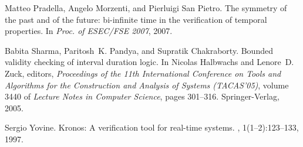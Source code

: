 \documentclass[a4paper]{article}
\theoremstyle{plain}
\theoremstyle{definition}
\begin{document}
\begin{thebibliography}{10}
Matteo Pradella, Angelo Morzenti, and Pierluigi {San Pietro}.
\newblock The symmetry of the past and of the future: bi-infinite time in the
  verification of temporal properties.
\newblock In {\em Proc. of ESEC/FSE 2007}, 2007.

Babita Sharma, Paritosh~K. Pandya, and Supratik Chakraborty.
\newblock Bounded validity checking of interval duration logic.
\newblock In Nicolas Halbwachs and Lenore~D. Zuck, editors, {\em Proceedings of
  the 11th International Conference on Tools and Algorithms for the
  Construction and Analysis of Systems (TACAS'05)}, volume 3440 of {\em Lecture
  Notes in Computer Science}, pages 301--316. Springer-Verlag, 2005.

Sergio Yovine.
\newblock Kronos: A verification tool for real-time systems.
, 1(1--2):123--133, 1997.

\end{thebibliography}
 
\end{document}
